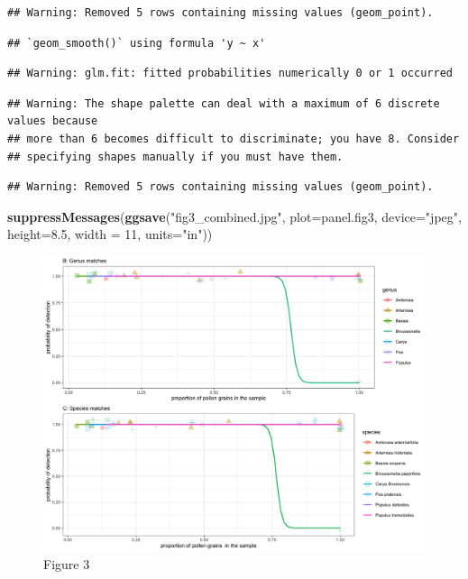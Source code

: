 \documentclass[
]{article}
\newenvironment{Shaded}{\begin{snugshade}}{\end{snugshade}}
\newcommand{\DataTypeTok}[1]{\textcolor[rgb]{0.13,0.29,0.53}{#1}}
\newcommand{\DecValTok}[1]{\textcolor[rgb]{0.00,0.00,0.81}{#1}}
\newcommand{\FloatTok}[1]{\textcolor[rgb]{0.00,0.00,0.81}{#1}}
\newcommand{\KeywordTok}[1]{\textcolor[rgb]{0.13,0.29,0.53}{\textbf{#1}}}
\newcommand{\NormalTok}[1]{#1}
\newcommand{\StringTok}[1]{\textcolor[rgb]{0.31,0.60,0.02}{#1}}
\begin{document}
\begin{verbatim}
## Warning: Removed 5 rows containing missing values (geom_point).
\end{verbatim}

\begin{verbatim}
## `geom_smooth()` using formula 'y ~ x'
\end{verbatim}

\begin{verbatim}
## Warning: glm.fit: fitted probabilities numerically 0 or 1 occurred
\end{verbatim}

\begin{verbatim}
## Warning: The shape palette can deal with a maximum of 6 discrete values because
## more than 6 becomes difficult to discriminate; you have 8. Consider
## specifying shapes manually if you must have them.
\end{verbatim}

\begin{verbatim}
## Warning: Removed 5 rows containing missing values (geom_point).
\end{verbatim}

\begin{Shaded}
\begin{Highlighting}[]
\KeywordTok{suppressMessages}\NormalTok{(}\KeywordTok{ggsave}\NormalTok{(}\StringTok{"fig3_combined.jpg"}\NormalTok{, }\DataTypeTok{plot=}\NormalTok{panel.fig3, }\DataTypeTok{device=}\StringTok{"jpeg"}\NormalTok{, }\DataTypeTok{height=}\FloatTok{8.5}\NormalTok{, }\DataTypeTok{width =} \DecValTok{11}\NormalTok{, }\DataTypeTok{units=}\StringTok{"in"}\NormalTok{))}
\end{Highlighting}
\end{Shaded}

\begin{figure}
\centering
\includegraphics{fig3_combined.jpg}
\caption{Figure 3}
\end{figure}
\end{document}
